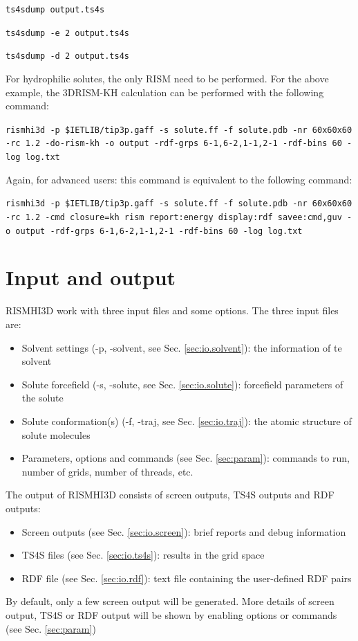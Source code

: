 \documentclass[aip,amsmath,amssymb,reprint,onecolumn]{revtex4-1}
\begin{document}
\texttt{\color{blue}\small ts4sdump output.ts4s}

\texttt{\color{blue}\small ts4sdump -e 2 output.ts4s}

\texttt{\color{blue}\small ts4sdump -d 2 output.ts4s}

For hydrophilic solutes, the only RISM need to be performed. For the above example, the 3DRISM-KH calculation can be performed with the following command:

\texttt{\color{blue}\small rismhi3d -p \$IETLIB/tip3p.gaff -s solute.ff -f solute.pdb -nr 60x60x60 -rc 1.2 -do-rism-kh -o output -rdf-grps 6-1,6-2,1-1,2-1 -rdf-bins 60 -log log.txt}

{Again, for advanced users: this command is equivalent to the following command:

\texttt{\color{blue}\small rismhi3d -p \$IETLIB/tip3p.gaff -s solute.ff -f solute.pdb -nr 60x60x60 -rc 1.2 -cmd closure=kh rism report:energy display:rdf savee:cmd,guv -o output -rdf-grps 6-1,6-2,1-1,2-1 -rdf-bins 60 -log log.txt}
}


\section{Input and output}

RISMHI3D work with three input files and some options. The three input files are:
\begin{itemize}
  \item Solvent settings (-p, -solvent, see Sec. \ref{sec:io.solvent}): the information of te solvent
  \item Solute forcefield (-s, -solute, see Sec. \ref{sec:io.solute}): forcefield parameters of the solute
  \item Solute conformation(s) (-f, -traj, see Sec. \ref{sec:io.traj}): the atomic structure of solute molecules
  \item Parameters, options and commands (see Sec. \ref{sec:param}): commands to run, number of grids, number of threads, etc.
\end{itemize}

The output of RISMHI3D consists of screen outputs, TS4S outputs and RDF outputs:
\begin{itemize}
  \item Screen outputs (see Sec. \ref{sec:io.screen}): brief reports and debug information
  \item TS4S files (see Sec. \ref{sec:io.ts4s}): results in the grid space
  \item RDF file (see Sec. \ref{sec:io.rdf}): text file containing the user-defined RDF pairs
\end{itemize}
By default, only a few screen output will be generated. More details of screen output, TS4S or RDF output will be shown by enabling options or commands (see Sec. \ref{sec:param})
\end{document}

